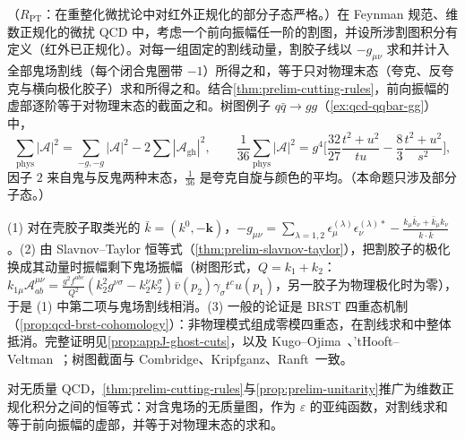 \begin{proposition}\label{prop:prelim-unitarity}
（$R_{\mathrm{PT}}$：在重整化微扰论中对红外正规化的部分子态严格。）在 Feynman 规范、维数正规化的微扰 QCD 中，考虑一个前向振幅任一阶的割图，并设所涉割图积分有定义（红外已正规化）。对每一组固定的割线动量，割胶子线以 $-g_{\mu\nu}$ 求和并计入全部鬼场割线（每个闭合鬼圈带 $-1$）所得之和，等于只对物理末态（夸克、反夸克与横向极化胶子）求和所得之和。结合\cref{thm:prelim-cutting-rules}，前向振幅的虚部逐阶等于对物理末态的截面之和。树图例子 $q\bar q\to gg$（\cref{ex:qcd-qqbar-gg}）中，%
\begin{equation}\label{eq:prelim-qqgg}
\sum_{\mathrm{phys}}|\mathcal A|^2=\sum_{-g,-g}|\mathcal A|^2-2\sum|\mathcal A_{\mathrm{gh}}|^2,\qquad
\frac1{36}\sum_{\mathrm{phys}}|\mathcal A|^2=g^4\Big[\frac{32}{27}\frac{t^2+u^2}{tu}-\frac83\frac{t^2+u^2}{s^2}\Big],
\end{equation}
因子 $2$ 来自鬼与反鬼两种末态，$\frac1{36}$ 是夸克自旋与颜色的平均。（本命题只涉及部分子态。）
\end{proposition}

\begin{proofsketch}
(1) 对在壳胶子取类光的 $\bar k=(k^0,-\mathbf k)$，$-g_{\mu\nu}=\sum_{\lambda=1,2}\epsilon^{(\lambda)}_\mu\epsilon^{(\lambda)*}_\nu-\frac{k_\mu\bar k_\nu+\bar k_\mu k_\nu}{k\cdot\bar k}$。(2) 由 Slavnov--Taylor 恒等式（\cref{thm:prelim-slavnov-taylor}），把割胶子的极化换成其动量时振幅剩下鬼场振幅（树图形式，$Q=k_1+k_2$：$k_{1\mu}\mathcal A^{\mu\nu}_{ab}=\frac{g^2f^{abc}}{Q^2}(k_2^2g^{\nu\sigma}-k_2^\nu k_2^\sigma)\bar v(p_2)\gamma_\sigma t^cu(p_1)$，另一胶子为物理极化时为零），于是 (1) 中第二项与鬼场割线相消。(3) 一般的论证是 BRST 四重态机制（\cref{prop:qcd-brst-cohomology}）：非物理模式组成零模四重态，在割线求和中整体抵消。完整证明见\cref{prop:appJ-ghost-cuts}，以及 Kugo--Ojima~\cite{KugoOjima1979}、'tHooft--Veltman~\cite{tHooftVeltman1972b}；树图截面与 Combridge、Kripfganz、Ranft~\cite{CombridgeKripfganzRanft1977}一致。
\end{proofsketch}

\begin{remark}\label{rem:prelim-cutting-dr}
对无质量 QCD，\cref{thm:prelim-cutting-rules}与\cref{prop:prelim-unitarity}推广为维数正规化积分之间的恒等式：对含鬼场的无质量图，作为 $\varepsilon$ 的亚纯函数，对割线求和等于前向振幅的虚部，并等于对物理末态的求和。
\end{remark}

